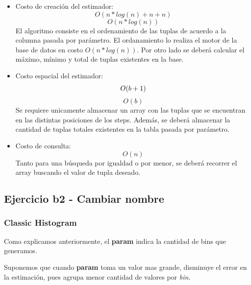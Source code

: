 \documentclass[10pt, a4paper,english,spanish,hidelinks]{article}
\begin{document}
\begin{itemize}

\item Costo de creación del estimador:
\begin{equation}
O(n*log(n) + n + n)
\end{equation}
\begin{equation}
O(n*log(n))
\end{equation}
El algoritmo consiste en el ordenamiento de las tuplas de acuerdo a la columna pasada por
parámetro. El ordanamiento lo realiza el motor de la base de datos en costo $O(n*log(n))$.
Por otro lado se deberá calcular el máximo, mínimo y total de tuplas existentes en la base.

\item Costo espacial del estimador:
\begin{equation}
O(b + 1) \\
\end{equation}
\begin{equation}
O(b)
\end{equation}
Se requiere unicamente almacenar un array con las tuplas que se encuentran en las distintas
posiciones de los steps. Además, se deberá almacenar la cantidad de tuplas totales
existentes en la tabla pasada por parámetro.

\item Costo de consulta:
\begin{equation}
O(n)
\end{equation}
Tanto para una búsqueda por igualdad o por menor, se deberá recorrer el array buscando
el valor de tupla deseado.

\end{itemize}

\subsection{Ejercicio b2 - Cambiar nombre}

\subsubsection{Classic Histogram}

Como explicamos anteriormente, el \textbf{param} indica la cantidad de bins que generamos.

Suponemos que cuando \textbf{param} toma un valor mas grande, disminuye el error en la estimación,
pues agrupa menor cantidad de valores por \textit{bin}.
\end{document}
